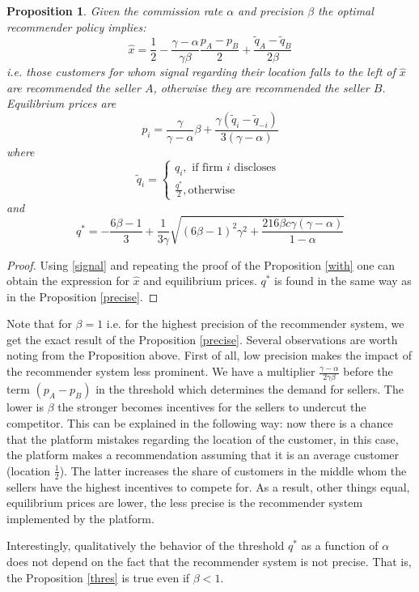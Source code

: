 \documentclass[a4paper]{article}
\newtheorem{proposition}[theorem]{Proposition}
\begin{document}
\begin{proposition}\label{notprecise}
	Given the commission rate $\alpha$ and precision $\beta$ the optimal recommender policy implies:
	$$\hat{x} = \frac{1}{2} - \frac{\gamma - \alpha}{\gamma \beta} \frac{p_A-p_B}{2} + \frac{\tilde{q}_A - \tilde{q}_B}{2 \beta}$$
	i.e. those customers for whom signal regarding their location falls to the left of $\hat{x}$ are recommended the seller $A$, otherwise they are recommended the seller $B$.
	Equilibrium prices are
	$$p_i = \frac{\gamma}{\gamma - \alpha} \beta + \frac{\gamma(\tilde{q}_i - \tilde{q}_{-i})}{3(\gamma - \alpha)}$$
	where
	$$\tilde{q}_i = \begin{cases}
	q_i, \text{ if firm }i\text{ discloses }\\
	\frac{q^*}{2}, \text{otherwise}
	\end{cases}$$
	and $$q^* = -\frac{6 \beta - 1}{3} + \frac{1}{3 \gamma} \sqrt{(6 \beta - 1)^2\gamma^2 + \frac{216 \beta c \gamma (\gamma - \alpha)}{1-\alpha}}$$
\end{proposition}
\begin{proof}
	Using \eqref{signal} and repeating the proof of the Proposition \ref{with} one can obtain the expression for $\hat{x}$ and equilibrium prices. $q^*$ is found in the same way as in the Proposition \ref{precise}.
\end{proof}
Note that for $\beta = 1$ i.e. for the highest precision of the recommender system, we get the exact result of the Proposition \ref{precise}. Several observations are worth noting from the Proposition above. First of all, low precision makes the impact of the recommender system less prominent. We have a multiplier $\frac{\gamma - \alpha}{2 \gamma \beta}$ before the term $(p_A - p_B)$ in the threshold which determines the demand for sellers. The lower is $\beta$ the stronger becomes incentives for the sellers to undercut the competitor. This can be explained in the following way: now there is a chance that the platform mistakes regarding the location of the customer, in this case, the platform makes a recommendation assuming that it is an average customer (location $\frac{1}{2}$). The latter increases the share of customers in the middle whom the sellers have the highest incentives to compete for. As a result, other things equal, equilibrium prices are lower, the less precise is the recommender system implemented by the platform.




Interestingly, qualitatively the behavior of the threshold $q^*$ as a function of $\alpha$ does not depend on the fact that the recommender system is not precise. That is, the Proposition \ref{thres} is true even if $\beta < 1$.
\end{document}
